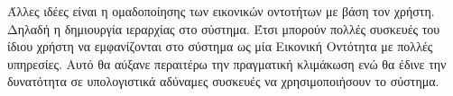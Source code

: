 Άλλες ιδέες είναι η ομαδοποίησης των εικονικών οντοτήτων με βάση τον χρήστη. Δηλαδή η δημιουργία ιεραρχίας στο σύστημα. Έτσι μπορούν πολλές συσκευές του ίδιου χρήστη να εμφανίζονται στο σύστημα ως μία Εικονική Οντότητα με πολλές υπηρεσίες. Αυτό θα αύξανε περαιτέρω την πραγματική κλιμάκωση ενώ θα έδινε την δυνατότητα σε υπολογιστικά αδύναμες συσκευές να χρησιμοποιήσουν το σύστημα. 
